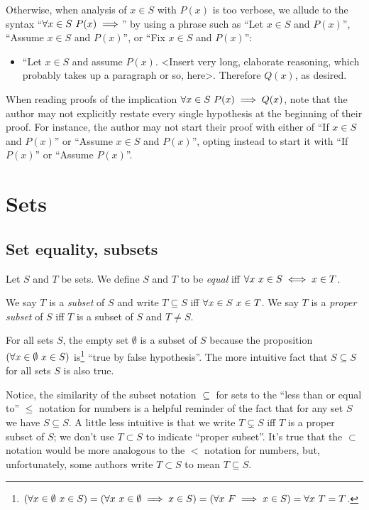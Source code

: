 Otherwise, when analysis of $x \in S$ with $P(x)$ is too verbose, we allude to the syntax ``$\forall x \in S \text{ } P(x) \implies$'' by using a phrase such as ``Let $x \in S$ and $P(x)$'', ``Assume $x \in S$ and $P(x)$'', or ``Fix $x \in S$ and $P(x)$'':

\begin{itemize}
    \item ``Let $x \in S$ and assume $P(x)$. <Insert very long, elaborate reasoning, which probably takes up a paragraph or so, here>. Therefore $Q(x)$, as desired.
\end{itemize}

When reading proofs of the implication $\forall x \in S \text{ } P(x) \implies Q(x)$, note that the author may not explicitly restate every single hypothesis at the beginning of their proof. For instance, the author may not start their proof with either of ``If $x \in S$ and $P(x)$'' or ``Assume $x \in S$ and $P(x)$'', opting instead to start it with ``If $P(x)$'' or ``Assume $P(x)$''.

\newpage

\section{Sets}

\subsection*{Set equality, subsets}

Let $S$ and $T$ be sets. We define $S$ and $T$ to be \textit{equal} iff $\forall x \text{ } x \in S \iff x \in T$.

We say $T$ is a \textit{subset} of $S$ and write $T \subseteq S$ iff $\forall x \in S \text{ } x \in T$. We say $T$ is a \textit{proper subset} of $S$ iff $T$ is a subset of $S$ and $T \neq S$.

For all sets $S$, the empty set $\emptyset$ is a subset of $S$ because the proposition $(\forall x \in \emptyset \text{ } x \in S)$ is\footnote{$(\forall x \in \emptyset \text{ } x \in S) = (\forall x \text{ } x \in \emptyset \implies x \in S) = (\forall x \text{ } F \implies x \in S) = \forall x \text{ } T = T$.} ``true by false hypothesis''. The more intuitive fact that $S \subseteq S$ for all sets $S$ is also true.

Notice, the similarity of the subset notation $\subseteq$ for sets to the ``less than or equal to'' $\leq$ notation for numbers is a helpful reminder of the fact that for any set $S$ we have $S \subseteq S$. A little less intuitive is that we write $T \subsetneq S$ iff $T$ is a proper subset of $S$; we don't use $T \subset S$ to indicate ``proper subset''. It's true that the $\subset$ notation would be more analogous to the $<$ notation for numbers, but, unfortunately, some authors write $T \subset S$ to mean $T \subseteq S$.

